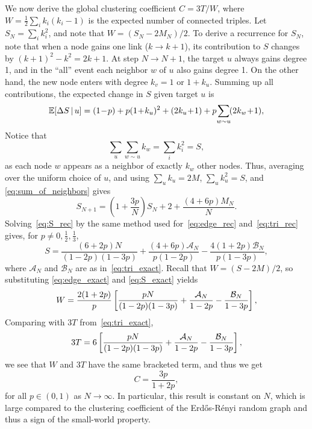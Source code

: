 \documentclass[aps,pre,twocolumn,showpacs,preprintnumbers]{revtex4-2}
\newcommand*{\E}{\mathbb{E}}
\begin{document}
We now derive the global clustering coefficient $C = 3T/W$, where $W = \frac{1}{2}\sum_{i} k_i(k_i-1)$ is the expected number of connected triples. Let $S_N = \sum_i k_i^2$, and note that $W=(S_N-2M_N)/2$. To derive a recurrence for $S_N$, note that when a node gains one link ($k\to k+1$), its contribution to $S$ changes by $(k+1)^2-k^2=2k+1$. At step $N\to N+1$, the target $u$ always gains degree 1, and in the ``all'' event each neighbor $w$ of $u$ also gains degree 1. On the other hand, the new node enters with degree $k_v=1$ or $1+k_u$. Summing up all contributions, the expected change in $S$ given target $u$ is
\begin{align}
  \E[\Delta S \,|\, u] = (1\!-\!p) + p(1\!+\!k_u)^2 + (2k_u\!+\!1) + p\!\sum_{w\sim u}\!(2k_w\!+\!1), \notag
\end{align}
Notice that
\begin{equation}
  \label{eq:sum_of_neighbors}
  \sum_u\sum_{w\sim u}k_w = \sum_i k_i^2 = S,
\end{equation}
as each node $w$ appears as a neighbor of exactly $k_w$ other nodes. Thus, averaging over the uniform choice of $u$, and using $\sum_u k_u = 2M$, $\sum_u k_u^2 = S$, and \eqref{eq:sum_of_neighbors} gives
\begin{equation}\label{eq:S_rec}
  S_{N+1} = \left(1+\frac{3p}{N}\right)S_N + 2 + \frac{(4+6p)M_N}{N}.
\end{equation}
Solving~\eqref{eq:S_rec} by the same method used for~\eqref{eq:edge_rec} and~\eqref{eq:tri_rec} gives, for $p\neq 0,\tfrac{1}{2},\tfrac{1}{3}$,
\begin{equation}\label{eq:S_exact}
  S = \frac{(6+2p)N}{(1-2p)(1-3p)} + \frac{(4+6p)\mathcal{A}_N}{p(1-2p)} - \frac{4(1+2p)\mathcal{B}_N}{p(1-3p)},
\end{equation}
where $\mathcal{A}_N$ and $\mathcal{B}_N$ are as in~\eqref{eq:tri_exact}. Recall that $W=(S-2M)/2$, so substituting \eqref{eq:edge_exact} and \eqref{eq:S_exact} yields 
\begin{equation}
  W = \frac{2(1 + 2p)}{p}\left[\frac{pN}{(1 -2p)(1 -3p)} + \frac{\mathcal{A}_N}{1 -2p} - \frac{\mathcal{B}_N}{1 -3p}\right], \notag
\end{equation}
Comparing with $3T$ from~\eqref{eq:tri_exact},
\begin{equation}
  3T = 6\left[\frac{pN}{(1 -2p)(1 -3p)} + \frac{\mathcal{A}_N}{1 -2p} - \frac{\mathcal{B}_N}{1 -3p}\right], \notag
\end{equation}
we see that $W$ and $3T$ have the same bracketed term, and thus we get
\begin{equation}\label{eq:clustering}
  C = \frac{3p}{1+2p},
\end{equation}
for all $p\in(0,1)$ as $N \to \infty$. In particular, this result is constant on $N$, which is large compared to the clustering coefficient of the Erdős-Rényi random graph and thus a sign of the small-world property.
\end{document}
